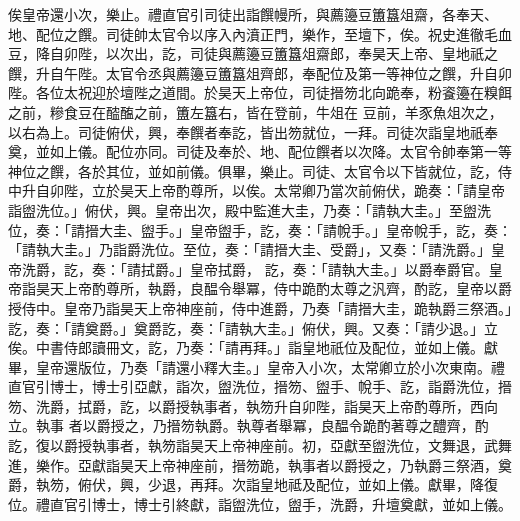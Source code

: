 \begin{pinyinscope}
 俟皇帝還小次，樂止。禮直官引司徒出詣饌幔所，與薦籩豆簠簋俎齋，各奉天、地、配位之饌。司徒帥太官令以序入內濆正門，樂作，至壇下，俟。祝史進徹毛血豆，降自卯陛，以次出，訖，司徒與薦籩豆簠簋俎齋郎，奉昊天上帝、皇地祇之饌，升自午陛。太官令丞與薦籩豆簠簋俎齊郎，奉配位及第一等神位之饌，升自卯陛。各位太祝迎於壇陛之道間。於昊天上帝位，司徒搢笏北向跪奉，粉餈籩在糗餌之前，糝食豆在醓醢之前，簠左簋右，皆在登前，牛俎在
 豆前，羊豕魚俎次之，以右為上。司徒俯伏，興，奉饌者奉訖，皆出笏就位，一拜。司徒次詣皇地祇奉奠，並如上儀。配位亦同。司徒及奉於、地、配位饌者以次降。太官令帥奉第一等神位之饌，各於其位，並如前儀。俱畢，樂止。司徒、太官令以下皆就位，訖，侍中升自卯陛，立於昊天上帝酌尊所，以俟。太常卿乃當次前俯伏，跪奏：「請皇帝詣盥洗位。」俯伏，興。皇帝出次，殿中監進大圭，乃奏：「請執大圭。」至盥洗位，奏：「請搢大圭、盥手。」皇帝盥手，訖，奏：「請帨手。」皇帝帨手，訖，奏：「請執大圭。」乃詣爵洗位。至位，奏：「請搢大圭、受爵」，又奏：「請洗爵。」皇帝洗爵，訖，奏：「請拭爵。」皇帝拭爵，
 訖，奏：「請執大圭。」以爵奉爵官。皇帝詣昊天上帝酌尊所，執爵，良醖令舉冪，侍中跪酌太尊之汎齊，酌訖，皇帝以爵授侍中。皇帝乃詣昊天上帝神座前，侍中進爵，乃奏「請搢大圭，跪執爵三祭酒。」訖，奏：「請奠爵。」奠爵訖，奏：「請執大圭。」俯伏，興。又奏：「請少退。」立俟。中書侍郎讀冊文，訖，乃奏：「請再拜。」詣皇地祇位及配位，並如上儀。獻畢，皇帝還版位，乃奏「請還小釋大圭。」皇帝入小次，太常卿立於小次東南。禮直官引博士，博士引亞獻，詣次，盥洗位，搢笏、盥手、帨手、訖，詣爵洗位，搢笏、洗爵，拭爵，訖，以爵授執事者，執笏升自卯陛，詣昊天上帝酌尊所，西向立。執事
 者以爵授之，乃搢笏執爵。執尊者舉冪，良醖令跪酌著尊之醴齊，酌訖，復以爵授執事者，執笏詣昊天上帝神座前。初，亞獻至盥洗位，文舞退，武舞進，樂作。亞獻詣昊天上帝神座前，搢笏跪，執事者以爵授之，乃執爵三祭酒，奠爵，執笏，俯伏，興，少退，再拜。次詣皇地祗及配位，並如上儀。獻畢，降復位。禮直官引博士，博士引終獻，詣盥洗位，盥手，洗爵，升壇奠獻，並如上儀。




\end{pinyinscope}
